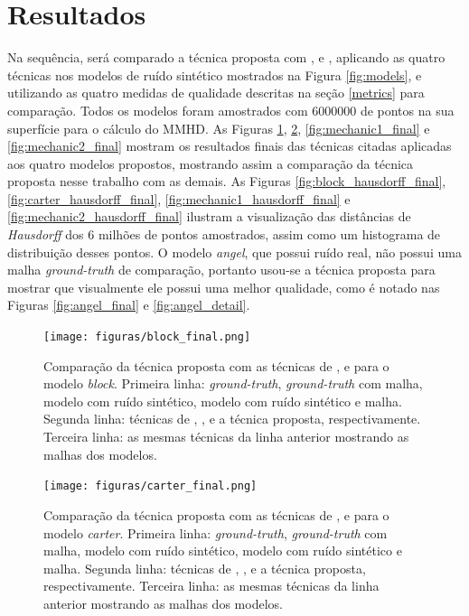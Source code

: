 \section{Resultados}
\label{sec:resultados}

Na sequência, será comparado a técnica proposta com \cite{zhang2015guided}, \cite{sun2007fast} e \cite{zheng2011bilateral}, aplicando as quatro técnicas nos modelos de ruído sintético mostrados na Figura \ref{fig:models}, e utilizando as quatro medidas de qualidade descritas na seção \ref{metrics} para comparação. Todos os modelos foram amostrados com 6000000 de pontos na sua superfície para o cálculo do MMHD. As Figuras \ref{fig:block_final}, \ref{fig:carter_final}, \ref{fig:mechanic1_final} e \ref{fig:mechanic2_final} mostram os resultados finais das técnicas citadas aplicadas aos quatro modelos propostos, mostrando assim a comparação da técnica proposta nesse trabalho com as demais. As Figuras \ref{fig:block_hausdorff_final}, \ref{fig:carter_hausdorff_final}, \ref{fig:mechanic1_hausdorff_final} e \ref{fig:mechanic2_hausdorff_final} ilustram a visualização das distâncias de \textit{Hausdorff} dos 6 milhões de pontos amostrados, assim como um histograma de distribuição desses pontos. O modelo \textit{angel}, que possui ruído real, não possui uma malha \textit{ground-truth} de comparação, portanto usou-se a técnica proposta para mostrar que visualmente ele possui uma melhor qualidade, como é notado nas Figuras \ref{fig:angel_final} e \ref{fig:angel_detail}.



\begin{figure}[p]
\captionsetup{width=\linewidth}
\centering
\texttt{[image: figuras/block\_final.png]}
\caption{Comparação da técnica proposta com as técnicas de \cite{zhang2015guided}, \cite{sun2007fast} e \cite{zheng2011bilateral} para o modelo \textit{block}. Primeira linha: \textit{ground-truth}, \textit{ground-truth} com malha, modelo com ruído sintético, modelo com ruído sintético e malha. Segunda linha: técnicas de \cite{zhang2015guided}, \cite{sun2007fast}, \cite{zheng2011bilateral} e a técnica proposta, respectivamente. Terceira linha: as mesmas técnicas da linha anterior mostrando as malhas dos modelos.}
\label{fig:block_final}
\end{figure}

\clearpage

\begin{figure}[p]
\captionsetup{width=\linewidth}
\centering
\texttt{[image: figuras/carter\_final.png]}
\caption{Comparação da técnica proposta com as técnicas de \cite{zhang2015guided}, \cite{sun2007fast} e \cite{zheng2011bilateral} para o modelo \textit{carter}. Primeira linha: \textit{ground-truth}, \textit{ground-truth} com malha, modelo com ruído sintético, modelo com ruído sintético e malha. Segunda linha: técnicas de \cite{zhang2015guided}, \cite{sun2007fast}, \cite{zheng2011bilateral} e a técnica proposta, respectivamente. Terceira linha: as mesmas técnicas da linha anterior mostrando as malhas dos modelos.}
\label{fig:carter_final}
\end{figure}

